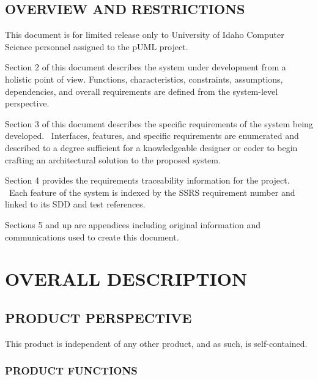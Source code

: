\documentclass[twoside,letterpaper]{article}
\begin{document}
\subsection[OVERVIEW AND RESTRICTIONS]{\rmfamily\bfseries
OVERVIEW AND RESTRICTIONS}
{
This document is for limited release only to University of Idaho Computer Science personnel assigned to the pUML project.
}


\bigskip

{
Section 2 of this document describes the system under development from a holistic point of view. 
\newline Functions, characteristics, constraints, assumptions, dependencies, and overall requirements are defined from the system-level perspective.
}


\bigskip

{
Section 3 of this document describes the specific requirements of the
system being developed. \ Interfaces, features, and specific
requirements are enumerated and described to a degree sufficient for a
knowledgeable designer or coder to begin crafting an architectural
solution to the proposed system.}


\bigskip

{
Section 4 provides the requirements traceability information for the
project. \ Each feature of the system is indexed by the SSRS
requirement number and linked to its SDD and test references.}


\bigskip

{
Sections 5 and up are appendices including original information and
communications used to create this document.}











\clearpage\section[OVERALL DESCRIPTION]{\rmfamily\bfseries
OVERALL DESCRIPTION}

\subsection[PRODUCT PERSPECTIVE]{\rmfamily\bfseries
PRODUCT PERSPECTIVE}
{
This product is independent of any other product, and as such, is self-contained.
}

\subsubsection[PRODUCT FUNCTIONS]
{\bfseries PRODUCT FUNCTIONS}
\end{document}
